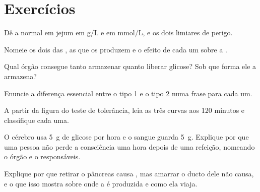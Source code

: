 \section{Exercícios}

\begin{exercise}[$\star$]\label{exo:g12:glucose-and-diabetes:1}
Dê a  normal em jejum em \unit{g/L} e em \unit{mmol/L}, e os
dois limiares de perigo.
\end{exercise}

\begin{exercise}[$\star$]\label{exo:g12:glucose-and-diabetes:2}
Nomeie os dois  das , as  que os produzem e o
efeito de cada um sobre a .
\end{exercise}

\begin{exercise}[$\star$]\label{exo:g12:glucose-and-diabetes:3}
Qual órgão consegue tanto armazenar quanto liberar glicose? Sob que
forma ele a armazena?
\end{exercise}

\begin{exercise}[$\star$]\label{exo:g12:glucose-and-diabetes:4}
Enuncie a diferença essencial entre o  tipo 1 e o tipo 2 numa
frase para cada um.
\end{exercise}

\begin{exercise}[$\star$]\label{exo:g12:glucose-and-diabetes:5}
A partir da figura do teste de tolerância, leia as três curvas aos 120
minutos e classifique cada uma.
\end{exercise}

\begin{exercise}[$\star\star$]\label{exo:g12:glucose-and-diabetes:6}
O cérebro usa \qty{5}{g} de glicose por hora e o sangue guarda
\qty{5}{g}. Explique por que uma pessoa não perde a consciência uma
hora depois de uma refeição, nomeando o órgão e o  responsáveis.
\end{exercise}

\begin{exercise}[$\star\star$]\label{exo:g12:glucose-and-diabetes:7}
Explique por que retirar o pâncreas causa , mas amarrar o ducto
dele não causa, e o que isso mostra sobre onde a  é produzida e
como ela viaja.
\end{exercise}

